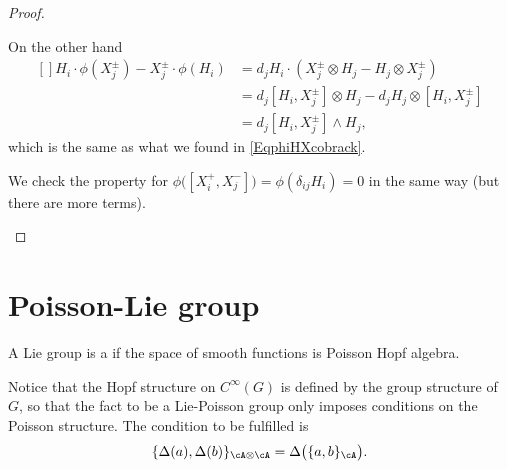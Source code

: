 \begin{proof}
\begin{enumerate}
\begin{equation}
            \end{equation}
            On the other hand
            \begin{equation}
                \begin{aligned}[]
                    H_i\cdot \phi(X_j^{\pm})-X_j^{\pm}\cdot\phi(H_i)&=d_j H_i\cdot(X_j^{\pm}\otimes H_j-H_j\otimes X_j^{\pm})\\
                    &=d_j[H_i,X_j^{\pm}]\otimes H_j-d_j H_j\otimes[H_i,X_j^{\pm}]\\
                    &=d_j[H_i,X_j^{\pm}]\wedge H_j,
                \end{aligned}
            \end{equation}
            which is the same as what we found in \eqref{EqphiHXcobrack}.

            We check the property for \( \phi\big( [X_i^+,X_j^-] \big)=\phi(\delta_{ij}H_i)=0\) in the same way (but there are more terms).
    \end{enumerate}
    
\end{proof}


\section{Poisson-Lie group}

\begin{definition}
    A Lie group is a  if the space of smooth functions is Poisson Hopf algebra.
\end{definition}
Notice that the Hopf structure on $ C^{\infty}(G)$ is defined by the group structure of $G$, so that the fact to be a Lie-Poisson group only imposes conditions on the Poisson structure. The condition to be fulfilled is
\begin{equation}	\label{EqCondcmpDelPoiss}
\{ \Delta(a),\Delta(b) \}_{\cA\otimes\cA}=\Delta\big( \{ a,b \}_{\cA} \big).
\end{equation}

